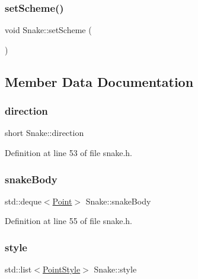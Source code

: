 \subsubsection{\texorpdfstring{setScheme()}{setScheme()}}
{\footnotesize\ttfamily void Snake\+::set\+Scheme (\begin{DoxyParamCaption}{ }\end{DoxyParamCaption})}



\subsection{Member Data Documentation}
\mbox{\label{class_snake_aee6d8cb1404c33a9b7e132a99e055590}} 
\subsubsection{\texorpdfstring{direction}{direction}}
{\footnotesize\ttfamily short Snake\+::direction\hspace{0.3cm}{\ttfamily [private]}}



Definition at line 53 of file snake.\+h.

\mbox{\label{class_snake_aaf288745dcc19ef13a1330bb55f1471c}} 
\subsubsection{\texorpdfstring{snakeBody}{snakeBody}}
{\footnotesize\ttfamily std\+::deque$<$\mbox{\hyperlink{common_8h_aa9cfdb80b4ca12013a2de8a3b9b97981}{Point}}$>$ Snake\+::snake\+Body\hspace{0.3cm}{\ttfamily [private]}}



Definition at line 55 of file snake.\+h.

\mbox{\label{class_snake_a7db439ed2dd1cfea4c061e6ffd6ec54c}} 
\subsubsection{\texorpdfstring{style}{style}}
{\footnotesize\ttfamily std\+::list$<$\mbox{\hyperlink{common_8h_afd9cb36d6ef309c77ea1e3177e19c623}{Point\+Style}}$>$ Snake\+::style\hspace{0.3cm}{\ttfamily [private]}}



